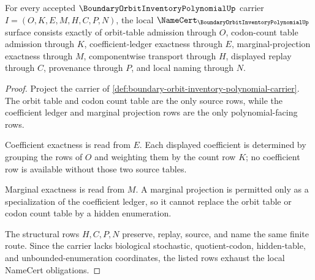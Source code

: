 \begin{theorem}
\label{thm:boundary-orbit-inventory-polynomial-obligations}
For every accepted $\BoundaryOrbitInventoryPolynomialUp$ carrier $I=(O,K,E,M,H,C,P,N)$, the local $\NameCert_{\BoundaryOrbitInventoryPolynomialUp}$ surface consists exactly of orbit-table admission through $O$, codon-count table admission through $K$, coefficient-ledger exactness through $E$, marginal-projection exactness through $M$, componentwise transport through $H$, displayed replay through $C$, provenance through $P$, and local naming through $N$.
\end{theorem}
\begin{proof}
Project the carrier of \autoref{def:boundary-orbit-inventory-polynomial-carrier}. The orbit table and codon count table are the only source rows, while the coefficient ledger and marginal projection rows are the only polynomial-facing rows.

Coefficient exactness is read from $E$. Each displayed coefficient is determined by grouping the rows of $O$ and weighting them by the count row $K$; no coefficient row is available without those two source tables.

Marginal exactness is read from $M$. A marginal projection is permitted only as a specialization of the coefficient ledger, so it cannot replace the orbit table or codon count table by a hidden enumeration.

The structural rows $H,C,P,N$ preserve, replay, source, and name the same finite route. Since the carrier lacks biological stochastic, quotient-codon, hidden-table, and unbounded-enumeration coordinates, the listed rows exhaust the local NameCert obligations.
\end{proof}


